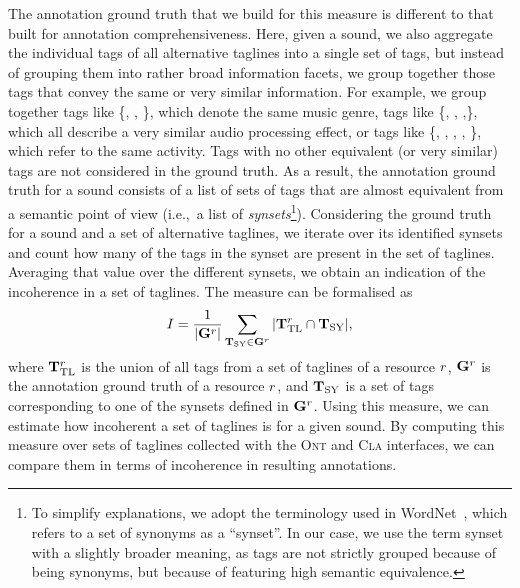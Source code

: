 \begin{itemize}
The annotation ground truth that we build for this measure is different to that built for annotation comprehensiveness.
Here, given a sound, we also aggregate the individual tags of all alternative taglines into a single set of tags, but instead of grouping them into rather broad information facets, we group together those tags that convey the same or very similar information.
For example, we group together tags like \{, , \}, which denote the same music genre, tags like \{, , ,\}, which all describe a very similar audio processing effect, or tags like \{, , , , \}, which refer to the same activity. Tags with no other equivalent (or very similar) tags are not considered in the ground truth.
As a result, the annotation ground truth for a sound consists of a list of sets of tags that are almost equivalent from a semantic point of view (i.e.,~a list of \emph{synsets}\footnote{To simplify explanations, we adopt the terminology used in WordNet~\citep{Miller1995}, which refers to a set of synonyms as a ``synset''. In our case, we use the term synset with a slightly broader meaning, as tags are not strictly grouped because of being synonyms, but because of featuring high semantic equivalence.}). 
Considering the ground truth for a sound and a set of alternative taglines, we iterate over its identified synsets and count how many of the tags in the synset are present in the set of taglines. Averaging that value over the different synsets, we obtain an indication of the incoherence in a set of taglines. %
The measure can be formalised as 
\begin{equation} I = \frac{1}{|\mathbf{G}^r|}\sum\limits_{\mathbf{T}_\text{SY} \in \mathbf{G}^r}{|\mathbf{T}^r_\text{TL} \cap \mathbf{T}_\text{SY}| }
\text{,} 
\label{ontology:eq:choerence_in_annotations} \end{equation}
where $\mathbf{T}^r_\text{TL}$ is the union of all tags from a set of taglines of a resource $r$, $\mathbf{G}^r$ is the annotation ground truth of a resource $r$, and $\mathbf{T}_\text{SY}$ is a set of tags corresponding to one of the synsets defined in $\mathbf{G}^r$.
Using this measure, we can estimate how incoherent a set of taglines is for a given sound. By computing this measure over sets of taglines collected with the \textsc{Ont} and \textsc{Cla} interfaces, we can compare them in terms of incoherence in resulting annotations.

\end{itemize}

